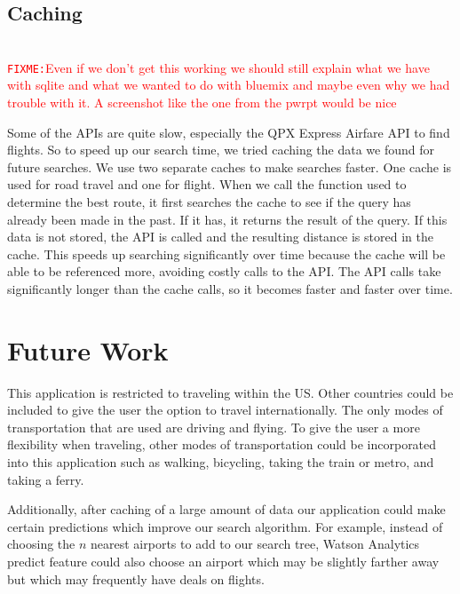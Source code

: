 \documentclass[11pt]{article}
\newcommand{\FIXME}[1]{ \ \\ \hspace* {-1.5 cm}
  \textcolor{red}{\texttt{FIXME:}#1} \medskip\par}
\begin{document}
\subsection{Caching}
\FIXME{Even if we don't get this working we should still explain what we have with sqlite and what we wanted to do with bluemix and maybe even why we had trouble with it. A screenshot like the one from the pwrpt would be nice}

Some of the APIs are quite slow, especially the QPX Express Airfare API to find flights. So to speed up our search time, we tried caching the data we found for future searches.
We use two separate caches to make searches faster. One cache is used for road travel and one for flight. When we call the function used to determine the best route, it first searches the cache to see if the query has already been made in the past. If it has, it returns the result of the query. If this data is not stored, the API is called and the resulting distance is stored in the cache. This speeds up searching significantly over time because the cache will be able to be referenced more, avoiding costly calls to the API. The API calls take significantly longer than the cache calls, so it becomes faster and faster over time. 

\section{Future Work}
This application is restricted to traveling within the US. Other countries could be included to give the user the option to travel internationally. The only modes of transportation that are used are driving and flying. To give the user a more flexibility when traveling, other modes of transportation could be incorporated into this application such as walking, bicycling, taking the train or metro, and taking a ferry.

Additionally, after caching of a large amount of data our application could make certain predictions which improve our search algorithm.  For example, instead of choosing the $n$ nearest airports to add to our search tree, Watson Analytics predict feature could also choose an airport which may be slightly farther away but which may frequently have deals on flights.
				
\end{document}
